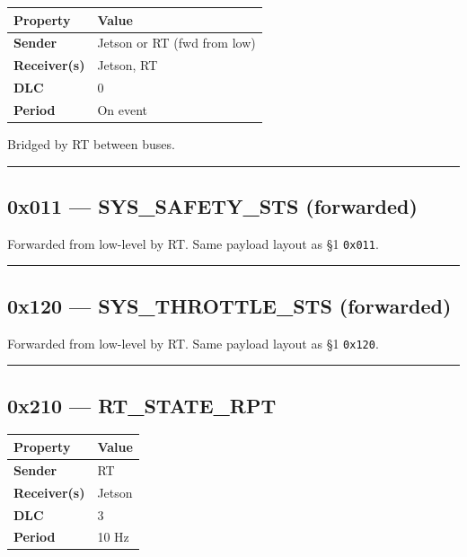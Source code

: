 \begin{longtable}[]{@{}ll@{}}
\toprule\noalign{}
Property & Value \\
\midrule\noalign{}
\endhead
\bottomrule\noalign{}
\endlastfoot
\textbf{Sender} & Jetson or RT (fwd from low) \\
\textbf{Receiver(s)} & Jetson, RT \\
\textbf{DLC} & 0 \\
\textbf{Period} & On event \\
\end{longtable}

Bridged by RT between buses.

\begin{center}\rule{0.5\linewidth}{0.5pt}\end{center}

\subsection{0x011 --- SYS\_SAFETY\_STS
(forwarded)}\label{x011-sys_safety_sts-forwarded}

Forwarded from low-level by RT. Same payload layout as §1 \texttt{0x011}.

\begin{center}\rule{0.5\linewidth}{0.5pt}\end{center}

\subsection{0x120 --- SYS\_THROTTLE\_STS
(forwarded)}\label{x120-sys_throttle_sts-forwarded}

Forwarded from low-level by RT. Same payload layout as §1 \texttt{0x120}.

\begin{center}\rule{0.5\linewidth}{0.5pt}\end{center}

\subsection{0x210 --- RT\_STATE\_RPT}\label{x210-rt_state_rpt}

\begin{longtable}[]{@{}ll@{}}
\toprule\noalign{}
Property & Value \\
\midrule\noalign{}
\endhead
\bottomrule\noalign{}
\endlastfoot
\textbf{Sender} & RT \\
\textbf{Receiver(s)} & Jetson \\
\textbf{DLC} & 3 \\
\textbf{Period} & 10 Hz \\
\end{longtable}

